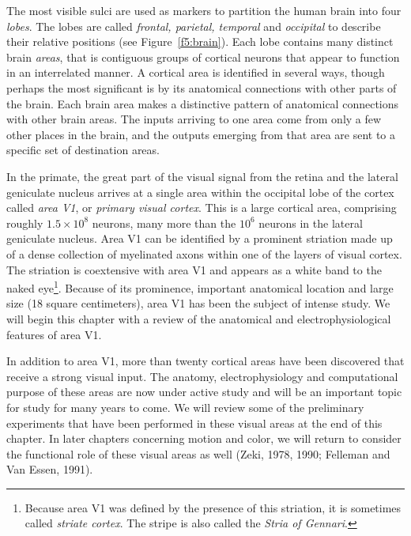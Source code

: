 The most visible sulci are used as markers to partition the human brain
into four {\em lobes}.  The lobes are called {\em frontal,
parietal, temporal} and {\em occipital} to describe their relative positions
(see Figure~\ref{f5:brain}).  Each lobe contains many distinct brain
{\em areas}, that is contiguous groups of cortical neurons that appear to
function in an interrelated manner.
A cortical area is identified in several ways, though perhaps
the most significant is by its anatomical connections with other parts
of the brain.  Each brain area makes a distinctive pattern of
anatomical connections with other brain areas.  The inputs arriving to
one area come from only a few other places in the brain, and the
outputs emerging from that area are sent to a specific set of
destination areas.

In the primate, the great part of the
visual signal from the retina and
the lateral geniculate nucleus
arrives at a single area within the occipital lobe 
of the cortex called {\em area V1}, or
{\em primary visual cortex}.  
This is a large cortical area, comprising
roughly $1.5 \times 10^8$ neurons, many more than the
$10^6$ neurons in the lateral geniculate nucleus.
Area V1 can be identified by a prominent striation
made up of a dense collection of 
myelinated axons within
one of the layers of visual cortex.
The striation is coextensive with
area V1 and appears as a white band to the naked eye\footnote{
Because area V1 was defined by the presence of
this striation, it is sometimes called {\em striate cortex}.
The stripe is also called the {\em Stria of Gennari}.}.
Because of its prominence, important anatomical location and
large size (18 square centimeters),
area V1 has been the subject of intense study.
We will begin
this chapter with a review
of the anatomical and electrophysiological features of area V1.

In addition to area V1, more than twenty cortical areas have been
discovered that receive a strong visual input.  The anatomy,
electrophysiology and computational purpose of these areas are now
under active study and will be an important topic for study for many
years to come.  We will review some of the preliminary experiments
that have been performed in these visual areas at the end of this
chapter.  In later chapters concerning motion and color, we will
return to consider the functional role of these visual areas as well
(Zeki, 1978, 1990; Felleman and Van Essen, 1991).

